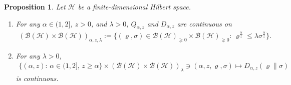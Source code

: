 \documentclass[unsortedaddress,superscriptaddress,pra,notitlepage]{revtex4}
\newtheorem{prop}[definition]{Proposition}
\def\B{{\mathcal B}}
\def\rho{\varrho}
\def\hil{{\mathcal H}}
\def\bz{\left(}
\def\jz{\right)}
\def\pne{_{\gneq 0}}
\begin{document}
\begin{prop}\label{prop:az cont}
Let $\hil$ be a finite-dimensional Hilbert space.
\begin{enumerate}
\item\label{az cont1}
For any $\alpha\in(1,2]$, $z>0$, and  
$\lambda>0$, $Q_{\alpha,z}$ and $D_{\alpha,z}$ are continuous on 
\begin{align*}
\bz\B(\hil)\times\B(\hil)\jz_{\alpha,z,\lambda}:=\{(\rho,\sigma)\in\B(\hil)\pne\times\B(\hil)\pne:\,\rho^{\frac{\alpha}{z}}\le\lambda\sigma^{\frac{\alpha}{z}}\}.
\end{align*}

\item\label{az cont2}
For any $\lambda>0$,
\begin{align}\label{az joint cont2}
\{(\alpha,z):\,\alpha\in(1,2],\,z\ge \alpha\}\times(\B(\hil)\times\B(\hil))_{\lambda}
\ni(\alpha,z,\rho,\sigma)\mapsto D_{\alpha,z}(\rho\|\sigma)
\end{align}
is continuous.
\end{enumerate}
\end{prop}
\end{document}
